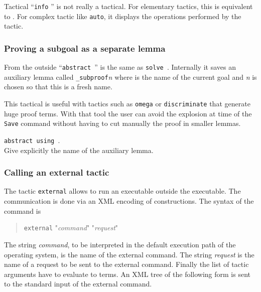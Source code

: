 Tactical ``{\tt info} {\tacexpr}'' is not really a tactical. For
elementary tactics, this is equivalent to \tacexpr. For complex tactic
like \texttt{auto}, it displays the operations performed by the
tactic.

\subsubsection[Proving a subgoal as a separate lemma]{Proving a subgoal as a separate lemma
}

From the outside ``\texttt{abstract \tacexpr}'' is the same as
{\tt solve \tacexpr}. Internally it saves an auxiliary lemma called 
{\ident}\texttt{\_subproof}\textit{n} where {\ident} is the name of the
current goal and \textit{n} is chosen so that this is a fresh name.

This tactical is useful with tactics such as \texttt{omega} or
\texttt{discriminate} that generate huge proof terms. With that tool
the user can avoid the explosion at time of the \texttt{Save} command
without having to cut manually the proof in smaller lemmas.

\begin{Variants}
\item \texttt{abstract {\tacexpr} using {\ident}}.\\
  Give explicitly the name of the auxiliary lemma.
\end{Variants}

\ErrMsg {}

\subsubsection[Calling an external tactic]{Calling an external tactic}

The tactic {\tt external} allows to run an executable outside the
{\Coq} executable. The communication is done via an XML encoding of
constructions. The syntax of the command is

\begin{quote}
{\tt external} "\textsl{command}" "\textsl{request}" \nelist{\tacarg}{}
\end{quote}

The string \textsl{command}, to be interpreted in the default
execution path of the operating system, is the name of the external
command. The string \textsl{request} is the name of a request to be
sent to the external command. Finally the list of tactic arguments
have to evaluate to terms. An XML tree of the following form is sent
to the standard input of the external command.
\medskip

